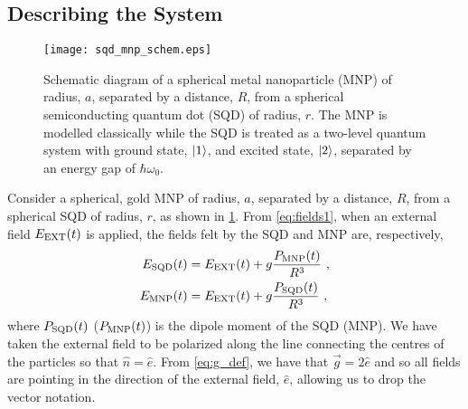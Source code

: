 \subsection{Describing the System}\label{sec:sqd-mnp_setup}

\begin{figure}[ht]
    \centering
    \texttt{[image: sqd\_mnp\_schem.eps]}
    \caption{Schematic diagram of a spherical metal nanoparticle (MNP) of
        radius, $a$, separated by a distance, $R$, from a spherical
        semiconducting quantum dot (SQD) of radius, $r$.  The MNP is modelled
        classically while the SQD is treated as a two-level quantum system with
        ground state, $\left|1\right\rangle$, and excited state, $\left|2\right\rangle$, separated by
    an energy gap of $\hbar\omega_0$.}
    \label{fig:sqd-mnp_scem}
\end{figure}

\noindent Consider a spherical, gold MNP of radius, $a$, separated by a distance,
$R$, from a spherical
SQD of radius, $r$, as shown in \cref{fig:sqd-mnp_scem}.
From \cref{eq:fields1}, when an external field $E_\text{EXT}(t)$ is applied, the
fields felt by the SQD and MNP are, respectively,
%
\begin{align}
    \esqd(t) &= \eext(t) + g\frac{\pmnp(t)}{\epsb R^3} \ , \label{eq:esqd}\\
    \emnp(t) &= \eext(t) + g\frac{\psqd(t)}{\epsb R^3} \ ,
\end{align}
%
where $P_\text{SQD}(t)$ ($P_\text{MNP}(t)$) is the dipole moment of the SQD (MNP).
We have taken the external field to be polarized along the line connecting the
centres of the particles so that $\hat n=\hat e$. From \cref{eq:g_def}, we have
that $\vec{g}=2\hat e$ and so all fields are pointing in the direction of the
external field, $\hat e$, allowing us to drop the vector notation.

